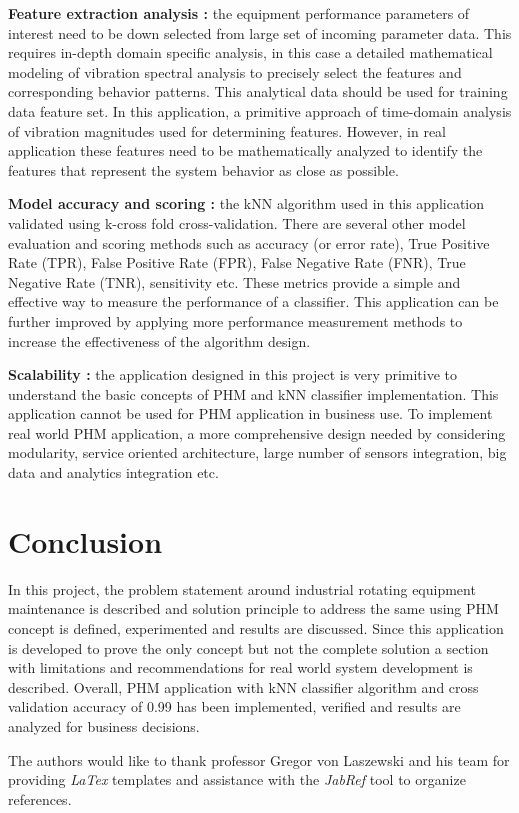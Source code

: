 \documentclass[sigconf]{acmart}
\begin{document}
\textbf{Feature extraction analysis :} the equipment performance parameters of interest need to be down selected from large set of incoming parameter data. This requires in-depth domain specific analysis, in this case a detailed mathematical modeling of vibration spectral analysis to precisely select the features and corresponding behavior patterns. This analytical data should be used for training data feature set. In this application, a primitive approach of time-domain analysis of vibration magnitudes used for determining features. However, in real application these features need to be mathematically analyzed to identify the features that represent the system behavior as close as possible.

\textbf{Model accuracy and scoring :} the kNN algorithm used in this application validated using k-cross fold cross-validation. There are several other model evaluation and scoring methods such as accuracy (or error rate), True Positive Rate (TPR), False Positive Rate (FPR), False Negative Rate (FNR), True Negative Rate (TNR), sensitivity etc. These metrics provide a simple and effective way to measure the performance of a classifier. This application can be further improved by applying more performance measurement methods to increase the effectiveness of the algorithm design.   

\textbf{Scalability :} the application designed in this project is very primitive to understand the basic concepts of PHM and kNN classifier implementation. This application cannot be used for PHM application in business use. To implement real world PHM application, a more comprehensive design needed by considering modularity, service oriented architecture, large number of sensors integration, big data and analytics integration etc.
\section{Conclusion}
In this project, the problem statement around industrial rotating equipment maintenance is described and solution principle to address the same using PHM concept is defined, experimented and results are discussed. Since this application is developed to prove the only concept but not the complete solution a section with limitations and recommendations for real world system development is described. Overall, PHM application with kNN classifier algorithm and cross validation accuracy of 0.99 has been implemented, verified and results are analyzed for business decisions.
\begin{acks}

  The authors would like to thank professor Gregor von Laszewski and his team for providing \textit{LaTex} templates and assistance with the \textit{JabRef} tool to organize references.

\end{acks}
\end{document}

